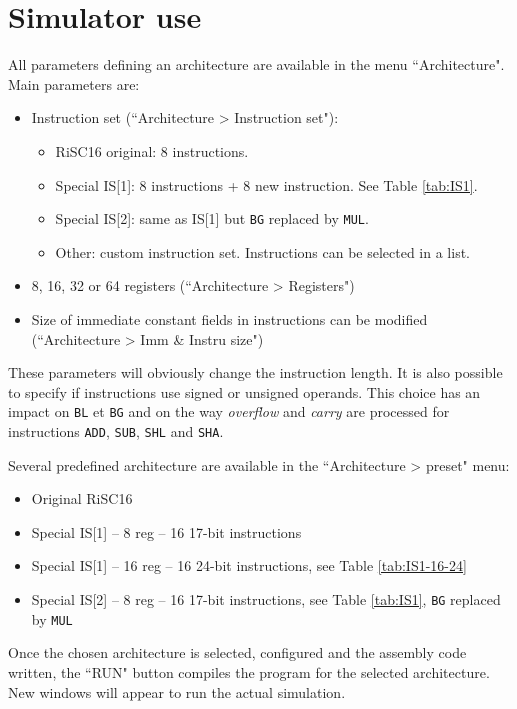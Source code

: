 \documentclass[10pt,a4paper]{article}
\theoremstyle{definition}%
\begin{document}
\section{Simulator use}
All parameters defining an architecture are available in the menu ``Architecture". Main parameters are:
\begin{itemize}
\item Instruction set (``Architecture > Instruction set"):
\begin{itemize}
\item RiSC16 original: 8 instructions.
\item Special IS[1]: 8 instructions + 8 new instruction. See Table \vref{tab:IS1}.
\item Special IS[2]: same as IS[1] but \verb!BG! replaced by \verb!MUL!.
\item Other: custom instruction set. Instructions can be selected in a list.
\end{itemize}
\item 8, 16, 32 or 64 registers (``Architecture > Registers")
\item Size of immediate constant fields in instructions can be modified (``Architecture > Imm \& Instru size")
\end{itemize}
These parameters will obviously change the instruction length.
%
It is also possible to specify if instructions use signed or unsigned operands. This choice has an impact on \verb!BL! et \verb!BG! and on the way \textit{overflow} and \textit{carry} are processed for instructions \verb!ADD!, \verb!SUB!, \verb!SHL! and  \verb!SHA!.

Several predefined architecture are available in the ``Architecture > preset" menu:
\begin{itemize}
\item Original RiSC16
\item Special IS[1] -- 8 reg -- 16 17-bit instructions
\item Special IS[1] -- 16 reg -- 16 24-bit instructions, see Table \vref{tab:IS1-16-24}
\item Special IS[2] -- 8 reg -- 16 17-bit instructions, see Table \vref{tab:IS1}, \verb!BG! replaced by \verb!MUL!
\end{itemize}

Once the chosen architecture is selected, configured and the assembly code written, the ``RUN" button compiles the program for the selected architecture. New windows will appear to run the actual simulation.
\end{document}
